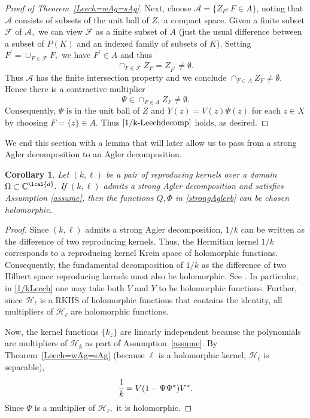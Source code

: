 \documentclass[a4paper,reqno,index]{amsart}
\numberwithin{equation}{section}
\newcommand{\CC}{\mathbb{C}}
\newcommand{\cH}{\mathcal{H}}
\newtheorem{corollary}[theorem]{Corollary}
\theoremstyle{definition}
\begin{document}
\begin{proof}[Proof of Theorem~\ref{Leech=wAg=sAg}]
Next, choose $\mathcal{A} = \{Z_F: F\in A\}$, noting that $\mathcal{A}$ consists of subsets of the unit ball of $Z,$ a compact space. Given a finite subset $\mathcal{F}$ of $\mathcal{A},$
 we can view $\mathcal{F}$ as a finite subset of $A$
 (just the usual difference between a subset of $P(K)$ and
 an indexed family of subsets of $K$).
 Setting $F^\prime =\cup_{F\in \mathcal{F}} F,$ we have
  $F^\prime \in A$ and thus
\[
  \cap_{F\in\mathcal{F}} Z_F = Z_{F^\prime} \ne \emptyset.
\]
 Thus $\mathcal{A}$ has the finite intersection property and we conclude
$ 
 \cap_{F\in A} Z_F \ne \emptyset.$
 Hence  there is a contractive multiplier 
 \[
   \Psi \in \cap_{F\in A} Z_F \ne \emptyset.
\]
 Consequently, $\Psi$ is in the unit ball of $Z$ and
 $Y(z)=V(z)\Psi(z)$ for each $z\in X$ by choosing 
 $F=\{z\}\in A.$ Thus $\eqref{1/k-Leechdecomp}$ holds, as desired. 
\end{proof}


 {We end this section with a lemma that will later allow us to pass from  a strong Agler decomposition  to an Agler decomposition.}


\begin{corollary} \label{strongAglertoAgler}
Let $(k, \ell)$ be a pair of reproducing kernels over a domain $\Omega\subset \CC^{\lcal{d}}.$  If $(k, \ell)$  admits a strong Agler decomposition and satisfies Assumption \ref{assume}, then the functions $Q, \Phi$ in \eqref{strongAglerb} can be chosen holomorphic. 
\end{corollary}

\begin{proof}
Since $(k, \ell)$ admits a strong Agler decomposition, $1/k$ can be written as the difference of two reproducing kernels. Thus, the Hermitian kernel $1/k$ corresponds to a reproducing kernel Krein space of holomorphic functions. Consequently, the fundamental decomposition of $1/k$ as the difference of two Hilbert space reproducing kernels must also be holomorphic. See \cite{gheondea2013survey}. In particular, in \eqref{1/kLeech} one may take both $V$ and $Y$ to be holomorphic functions. Further, since $\mathcal{H}_{\ell}$ is a RKHS of holomorphic functions that contains the identity, all multipliers of $\mathcal{H}_{\ell}$ are holomorphic functions. \par
Now, the kernel functions $\{k_z\}$ are linearly independent because the polynomials are multipliers of $\mathcal{H}_k$
as part of Assumption~\ref{assume}. By Theorem~\ref{Leech=wAg=sAg}
 (because $\ell$ is a holomorphic kernel, $\cH_\ell$ is
separable), 
\[\cfrac{1}{k}=V(1-\Psi\Psi^*)V^*. \]
Since $\Psi$ is a multiplier of $\mathcal{H}_{\ell},$ it is holomorphic.
\end{proof} 
\end{document}
